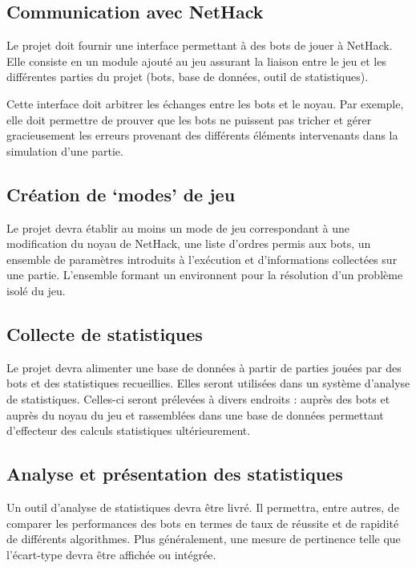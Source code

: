 \documentclass[12pt]{article}
\begin{document}
\subsection{Communication avec NetHack}

Le projet doit fournir une interface permettant à des bots de jouer à NetHack. Elle consiste en un module ajouté au jeu assurant la liaison entre le jeu et les différentes parties du projet (bots, base de données, outil de statistiques).

Cette interface doit arbitrer les échanges entre les bots et le noyau. Par exemple, elle doit permettre de prouver que les bots ne puissent pas tricher et gérer gracieusement les erreurs provenant des différents éléments intervenants dans la simulation d'une partie.

\subsection{Création de `modes' de jeu}

Le projet devra établir au moins un mode de jeu correspondant à une modification du noyau de NetHack, une liste d'ordres permis aux bots, un ensemble de paramètres introduits à l'exécution et d'informations collectées sur une partie. L'ensemble formant un environnent pour la résolution d'un problème isolé du jeu.

\subsection{Collecte de statistiques}

Le projet devra alimenter une base de données à partir de parties jouées par des bots et des statistiques recueillies. Elles seront utilisées dans un système d'analyse de statistiques. Celles-ci seront prélevées à divers endroits : auprès des bots et auprès du noyau du jeu et rassemblées dans une base de données permettant d'effecteur des calculs statistiques ultérieurement.

\subsection{Analyse et présentation des statistiques}

Un outil d'analyse de statistiques devra être livré. Il permettra, entre autres, de comparer les performances des bots en termes de taux de réussite et de rapidité de différents algorithmes. Plus généralement, une mesure de pertinence telle que l'écart-type devra être affichée ou intégrée.
\end{document}

